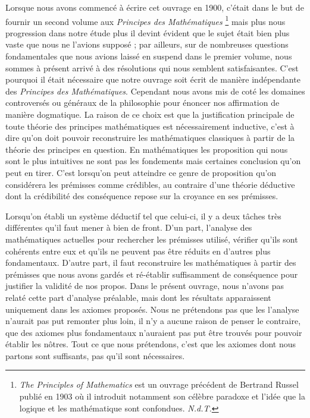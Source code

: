 \documentclass[a4paper]{book}
\begin{document}
Lorsque nous avons commencé à écrire cet ouvrage en 1900, c'était dans le but de fournir un second volume aux \textit{Principes des Mathématiques} \footnote{\textit{The Principles of Mathematics} est un ouvrage précédent de Bertrand Russel publié en 1903 où il introduit notamment son célèbre paradoxe et l'idée que la logique et les mathématique sont confondues. \textit{N.d.T.}} mais plus nous progression dans notre étude plus il devint évident que le sujet était bien plus vaste que nous ne l'avions supposé ; par ailleurs, sur de nombreuses questions fondamentales que nous avions laissé en suspend dans le premier volume, nous sommes à présent arrivé à des résolutions qui nous semblent satisfaisantes. C'est pourquoi il était nécessaire que notre ouvrage soit écrit de manière indépendante des \textit{Principes des Mathématiques}. Cependant nous avons mis de coté les domaines controversés ou généraux de la philosophie pour énoncer nos affirmation de manière dogmatique. La raison de ce choix est que la justification principale de toute théorie des principes mathématiques est nécessairement inductive, c'est à dire qu'on doit pouvoir reconstruire les mathématiques classiques à partir de la théorie des principes en question. En mathématiques les proposition qui nous sont le plus intuitives ne sont pas les fondements mais certaines conclusion qu'on peut en tirer. C'est lorsqu'on peut atteindre ce genre de proposition qu'on considérera les prémisses comme crédibles, au contraire d'une théorie déductive dont la crédibilité des conséquence repose sur la croyance en ses prémisses.
 
Lorsqu'on établi un système déductif tel que celui-ci, il y a deux tâches très différentes qu'il faut mener à bien de front. D'un part, l'analyse des mathématiques actuelles pour rechercher les prémisses utilisé, vérifier qu'ils sont cohérents entre eux et qu'ils ne peuvent pas être réduits en d'autres plus fondamentaux. D'autre part, il faut reconstruire les mathématiques à partir des prémisses que nous avons gardés et ré-établir suffisamment de conséquence pour justifier la validité de nos propos. Dans le présent ouvrage, nous n'avons pas relaté cette part d'analyse préalable, mais dont les résultats apparaissent uniquement dans les axiomes proposés. Nous ne prétendons pas que les l'analyse n'aurait pas put remonter plus loin, il n'y a aucune raison de penser le contraire, que des axiomes plus fondamentaux n'auraient pas put être trouvés pour pouvoir établir les nôtres. Tout ce que nous prétendons, c'est que les axiomes dont nous partons sont suffisants, pas qu'il sont nécessaires.
 
\end{document}
